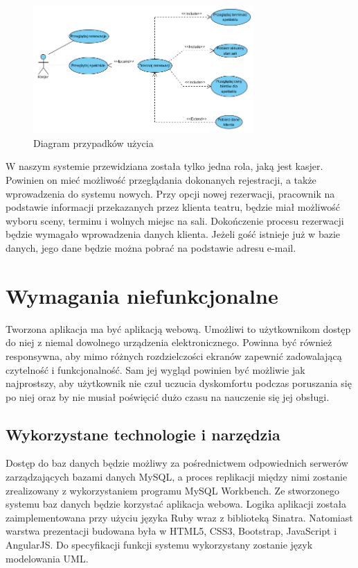 \documentclass{mgr}
\begin{document}
\begin{figure}[!ht]
	\centering
	\includegraphics[width=0.75\textwidth]{images/diagram_pu.png}
	\caption{Diagram przypadków użycia}
	\label{fig:diagram_pu}
\end{figure}

W naszym systemie przewidziana została tylko jedna rola, jaką jest kasjer. Powinien on mieć możliwość przeglądania dokonanych rejestracji, a także wprowadzenia do systemu nowych. Przy opcji nowej rezerwacji, pracownik na podstawie informacji przekazanych przez klienta teatru, będzie miał możliwość wyboru sceny, terminu i wolnych miejsc na sali. Dokończenie procesu rezerwacji będzie wymagało wprowadzenia danych klienta. Jeżeli gość istnieje już w bazie danych, jego dane będzie można pobrać na podstawie adresu e-mail.

\section{Wymagania niefunkcjonalne}
Tworzona aplikacja ma być aplikacją webową. Umożliwi to użytkownikom dostęp do niej z niemal dowolnego urządzenia elektronicznego. Powinna być również responsywna, aby mimo różnych rozdzielczości ekranów zapewnić zadowalającą czytelność i funkcjonalność. Sam jej wygląd powinien być możliwie jak najprostszy, aby użytkownik nie czuł uczucia dyskomfortu podczas poruszania się po niej oraz by nie musiał poświęcić dużo czasu na nauczenie się jej obsługi.

\subsection{Wykorzystane technologie i narzędzia}
Dostęp  do  baz  danych  będzie  możliwy  za  pośrednictwem  odpowiednich  serwerów zarządzających bazami danych MySQL, a proces replikacji między nimi zostanie zrealizowany z wykorzystaniem programu MySQL Workbench. Ze stworzonego systemu baz danych będzie korzystać aplikacja webowa. Logika aplikacji została zaimplementowana przy użyciu języka Ruby wraz z biblioteką Sinatra. Natomiast warstwa prezentacji budowana była w HTML5, CSS3, Bootstrap, JavaScript i AngularJS. Do  specyfikacji  funkcji systemu wykorzystany zostanie język modelowania UML.
\end{document}
